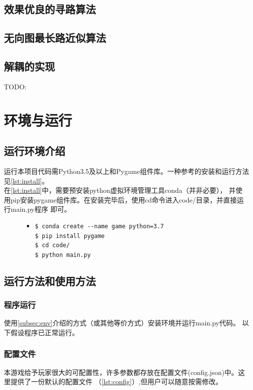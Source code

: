 \documentclass[a4paper]{article}
\begin{document}
\subsection{效果优良的寻路算法}
\subsection{无向图最长路近似算法}
\subsection{解耦的实现}
TODO:
\section{环境与运行}
\subsection{运行环境介绍}\label{subsec:env}
运行本项目代码需Python3.5及以上和Pygame组件库。一种参考的安装和运行方法
见\autoref{lst:install}。\\

在\autoref{lst:install}中，需要预安装python虚拟环境管理工具conda（并非必要），
并使用pip安装pygame组件库。在安装完毕后，使用cd命令进入code/目录，并直接运行main.py程序
即可。

\begin{figure}[!hbt]
\begin{itemize}
\item[] \begin{lstlisting}[style=myshell, label=lst:install, caption=安装运行环境的参考方法]
$ conda create --name game python=3.7 
$ pip install pygame
$ cd code/
$ python main.py
\end{lstlisting}
\end{itemize}
\end{figure}

\subsection{运行方法和使用方法}
\subsubsection{程序运行}
使用\autoref{subsec:env}介绍的方式（或其他等价方式）安装环境并运行main.py代码。
以下假设程序已正常运行。

\subsubsection{配置文件}
本游戏给予玩家很大的可配置性，许多参数都存放在配置文件(config.json)中。这里提供了一份默认的配置文件
（\autoref{lst:config}）,但用户可以随意按需修改。\\
\end{document}
